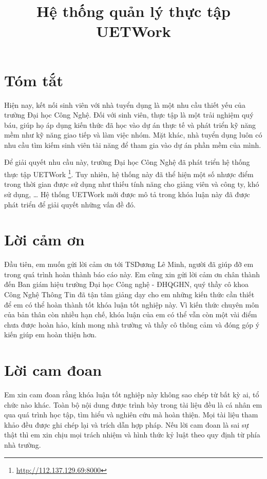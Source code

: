 \documentclass{report}
\title{Hệ thống quản lý thực tập UETWork}
\begin{document}

\clearpage{}

\chapter*{Tóm tắt}

Hiện nay, kết nối sinh viên với nhà tuyển dụng là một nhu cầu thiết yếu của trường Đại học Công Nghệ. Đối với sinh viên, thực tập là một trải nghiệm quý báu, giúp họ áp dụng kiến thức đã học vào dự án thực tế và phát triển kỹ năng mềm như kỹ năng giao tiếp và làm việc nhóm. Mặt khác, nhà tuyển dụng luôn có nhu cầu tìm kiếm sinh viên tài năng để tham gia vào dự án phần mềm của mình.

Để giải quyết nhu cầu này, trường Đại học Công Nghệ đã phát triển hệ thống thực tập UETWork \footnote{\url{http://112.137.129.69:8000}}. Tuy nhiên, hệ thống này đã thể hiện một số nhược điểm trong thời gian được sử dụng như thiếu tính năng cho giảng viên và công ty, khó sử dụng, \ldots{} Hệ thống UETWork mới được mô tả trong khóa luận này đã được phát triển để giải quyết những vấn đề đó.

\chapter*{Lời cảm ơn}

Đầu tiên, em muốn gửi lời cảm ơn tới TS\. Dương Lê Minh, người đã giúp đỡ em trong quá trình hoàn thành báo cáo này.
Em cũng xin gửi lời cảm ơn chân thành đến Ban giám hiệu trường Đại học Công nghệ - ĐHQGHN, quý thầy cô khoa Công Nghệ Thông Tin đã tận tâm giảng dạy cho em những kiến thức cần thiết để em có thể hoàn thành tốt khóa luận tốt nghiệp này.
Vì kiến thức chuyên môn của bản thân còn nhiều hạn chế, khóa luận của em có thể vẫn còn một vài điểm chưa được hoàn hảo, kính mong nhà trường và thầy cô thông cảm và đóng góp ý kiến giúp em hoàn thiện hơn.

\chapter*{Lời cam đoan}

Em xin cam đoan rằng khóa luận tốt nghiệp này không sao chép từ bất kỳ ai, tổ chức nào khác. Toàn bộ nội dung được trình bày trong tài liệu đều là cá nhân em qua quá trình học tập, tìm hiểu và nghiên cứu mà hoàn thiện. Mọi tài liệu tham khảo đều được ghi chép lại và trích dẫn hợp pháp. Nếu lời cam đoan là sai sự thật thì em xin chịu mọi trách nhiệm và hình thức kỷ luật theo quy định từ phía nhà trường.
\end{document}
